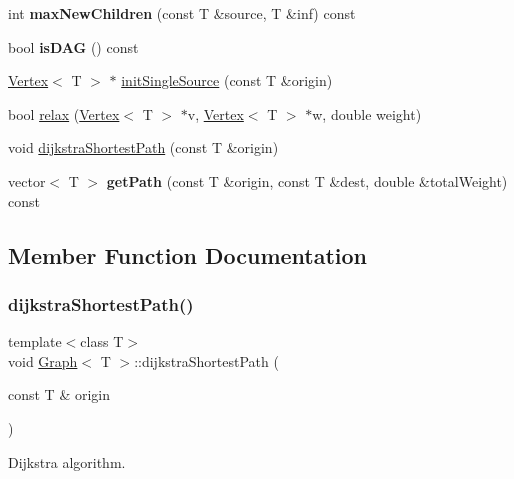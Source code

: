 \begin{DoxyCompactItemize}
\item 
\mbox{\label{class_graph_a3dbf946fc46257f2d799077ffba5980f}} 
int {\bfseries max\+New\+Children} (const T \&source, T \&inf) const
\item 
\mbox{\label{class_graph_a1ea1512afe5ab878301bc806c2eba9d2}} 
bool {\bfseries is\+D\+AG} () const
\item 
\mbox{\hyperlink{class_vertex}{Vertex}}$<$ T $>$ $\ast$ \mbox{\hyperlink{class_graph_ab78574b192c290ede05a031d361b97f9}{init\+Single\+Source}} (const T \&origin)
\item 
bool \mbox{\hyperlink{class_graph_a2cb89dd50ee5fee83ccd9204b80af055}{relax}} (\mbox{\hyperlink{class_vertex}{Vertex}}$<$ T $>$ $\ast$v, \mbox{\hyperlink{class_vertex}{Vertex}}$<$ T $>$ $\ast$w, double weight)
\item 
void \mbox{\hyperlink{class_graph_ac7238d1a3677996b627f8eb1b4300c9e}{dijkstra\+Shortest\+Path}} (const T \&origin)
\item 
\mbox{\label{class_graph_a5abed3d7a650413b8197e4662679008d}} 
vector$<$ T $>$ {\bfseries get\+Path} (const T \&origin, const T \&dest, double \&total\+Weight) const
\end{DoxyCompactItemize}


\subsection{Member Function Documentation}
\mbox{\label{class_graph_ac7238d1a3677996b627f8eb1b4300c9e}} 
\subsubsection{\texorpdfstring{dijkstra\+Shortest\+Path()}{dijkstraShortestPath()}}
{\footnotesize\ttfamily template$<$class T$>$ \\
void \mbox{\hyperlink{class_graph}{Graph}}$<$ T $>$\+::dijkstra\+Shortest\+Path (\begin{DoxyParamCaption}\item[{const T \&}]{origin }\end{DoxyParamCaption})}

Dijkstra algorithm. \mbox{\label{class_graph_ab78574b192c290ede05a031d361b97f9}} 
